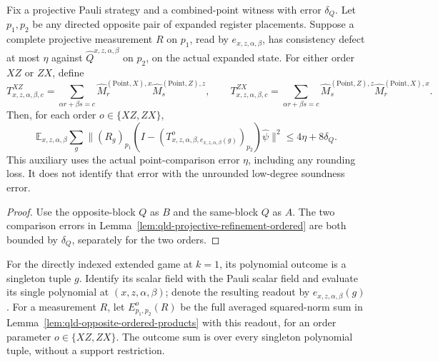 \begin{lemma}
\label{lem:qld-opposite-ordered-products}
\leanok
Fix a projective Pauli strategy and a combined-point witness with error
$\delta_Q$. Let $p_1,p_2$ be any directed opposite pair of expanded register
placements. Suppose a complete projective measurement $R$ on $p_1$, read
by $e_{x,z,\alpha,\beta}$, has consistency defect at most $\eta$ against
$\hat Q^{x,z,\alpha,\beta}$ on $p_2$, on the actual expanded state.
For either order $XZ$ or $ZX$, define
\[
 T^{XZ}_{x,z,\alpha,\beta,c}
 =\sum_{\alpha r+\beta s=c}\hat M^{(\mathrm{Point},X),x}_r
                              \hat M^{(\mathrm{Point},Z),z}_s,
 \qquad
 T^{ZX}_{x,z,\alpha,\beta,c}
 =\sum_{\alpha r+\beta s=c}\hat M^{(\mathrm{Point},Z),z}_s
                              \hat M^{(\mathrm{Point},X),x}_r.
\]
Then, for each order $o\in\{XZ,ZX\}$,
\[
 \mathbb E_{x,z,\alpha,\beta}\sum_g
 \|(R_g)_{p_1}(I-(T^o_{x,z,\alpha,\beta,e_{x,z,\alpha,\beta}(g)})_{p_2})
       \hat\psi\|^2\leq4\eta+8\delta_Q.
\]
This auxiliary uses the actual point-comparison error $\eta$, including any
rounding loss. It does not identify that error with the unrounded
low-degree soundness error.
\end{lemma}
\begin{proof}
\leanok
{}
Use the opposite-block $Q$ as $B$ and the same-block $Q$ as $A$.
The two comparison errors in Lemma~\ref{lem:qld-projective-refinement-ordered}
are both bounded by $\delta_Q$, separately for the two orders.
\end{proof}

\begin{definition}
\label{def:qld-extended-polynomial-ordered-error}
\leanok
For the directly indexed extended game at $k=1$, its polynomial outcome is
a singleton tuple $g$. Identify its scalar field with the Pauli scalar
field and evaluate its single polynomial at $(x,z,\alpha,\beta)$; denote
the resulting readout by $e_{x,z,\alpha,\beta}(g)$.
For a measurement $R$, let $E^o_{p_1,p_2}(R)$ be the full averaged
squared-norm sum in Lemma~\ref{lem:qld-opposite-ordered-products} with
this readout, for an order parameter $o\in\{XZ,ZX\}$. The outcome sum is over
every singleton polynomial tuple, without a support restriction.
\end{definition}

